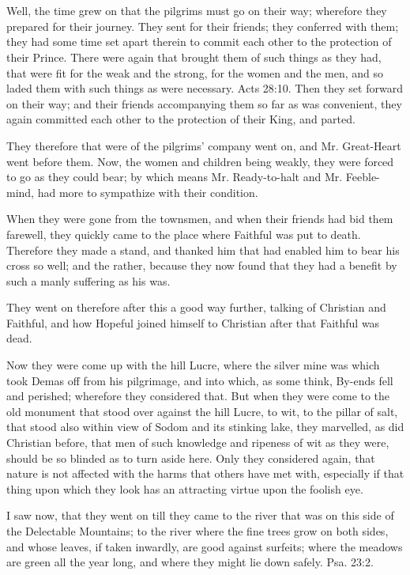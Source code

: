 \chapter[THE SEVENTH STAGE]{}

Well, the time grew on that the pilgrims must go on their way; wherefore they prepared for their journey. They sent for their friends; they conferred with them; they had some time set apart therein to commit each other to the protection of their Prince. There were again that brought them of such things as they had, that were fit for the weak and the strong, for the women and the men, and so laded them with such things as were necessary. Acts 28:10. Then they set forward on their way; and their friends accompanying them so far as was convenient, they again committed each other to the protection of their King, and parted.

They therefore that were of the pilgrims' company went on, and Mr. Great-Heart went before them. Now, the women and children being weakly, they were forced to go as they could bear; by which means Mr. Ready-to-halt and Mr. Feeble-mind, had more to sympathize with their condition.

When they were gone from the townsmen, and when their friends had bid them farewell, they quickly came to the place where Faithful was put to death. Therefore they made a stand, and thanked him that had enabled him to bear his cross so well; and the rather, because they now found that they had a benefit by such a manly suffering as his was.

They went on therefore after this a good way further, talking of Christian and Faithful, and how Hopeful joined himself to Christian after that Faithful was dead.

Now they were come up with the hill Lucre, where the silver mine was which took Demas off from his pilgrimage, and into which, as some think, By-ends fell and perished; wherefore they considered that. But when they were come to the old monument that stood over against the hill Lucre, to wit, to the pillar of salt, that stood also within view of Sodom and its stinking lake, they marvelled, as did Christian before, that men of such knowledge and ripeness of wit as they were, should be so blinded as to turn aside here. Only they considered again, that nature is not affected with the harms that others have met with, especially if that thing upon which they look has an attracting virtue upon the foolish eye.

I saw now, that they went on till they came to the river that was on this side of the Delectable Mountains; to the river where the fine trees grow on both sides, and whose leaves, if taken inwardly, are good against surfeits; where the meadows are green all the year long, and where they might lie down safely. Psa. 23:2.

